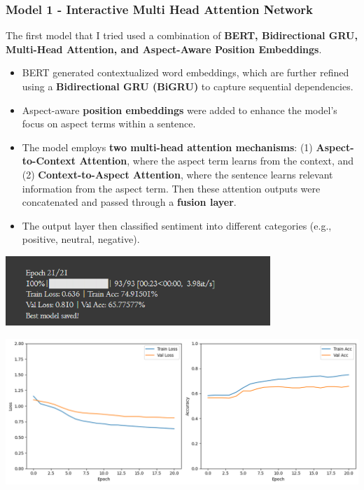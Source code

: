 \documentclass{article}
\begin{document}
\subsubsection{Model 1 - Interactive Multi Head Attention Network}
The first model that I tried used a combination of \textbf{BERT, Bidirectional GRU, Multi-Head Attention, and Aspect-Aware Position Embeddings}. 
\begin{itemize} 
\item BERT generated contextualized word embeddings, which are further refined using a \textbf{Bidirectional GRU (BiGRU)} to capture sequential dependencies. 
\item Aspect-aware \textbf{position embeddings} were added to enhance the model’s focus on aspect terms within a sentence. 
\item The model employs \textbf{two multi-head attention mechanisms}: (1) \textbf{Aspect-to-Context Attention}, where the aspect term learns from the context, and (2) \textbf{Context-to-Aspect Attention}, where the sentence learns relevant information from the aspect term. Then these attention outputs were concatenated and passed through a \textbf{fusion layer}.
\item The output layer then classified sentiment into different categories (e.g., positive, neutral, negative).
\end{itemize}
\begin{center}
\includegraphics[width=0.75\textwidth]{Model_1_Accuracy.png}
\end{center}
\begin{center}
\includegraphics[width=1\textwidth]{Architecture 1.png}
\end{center}
\end{document}
